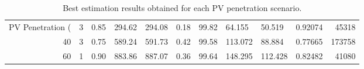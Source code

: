 \begin{table}
\caption{Best estimation results obtained for each PV penetration scenario.}
\label{tab:best_results}
\begin{tabular}{rrllllllllr}
\toprule
PV Penetration (%
\midrule
20 & 3 & 0.85 & 294.62 & 294.08 & 0.18 & 99.82 & 64.155 & 50.519 & 0.92074 & 45318 \\
40 & 3 & 0.75 & 589.24 & 591.73 & 0.42 & 99.58 & 113.072 & 88.884 & 0.77665 & 173758 \\
60 & 1 & 0.90 & 883.86 & 887.07 & 0.36 & 99.64 & 148.295 & 112.428 & 0.82482 & 41080 \\
\bottomrule
\end{tabular}
\end{table}
